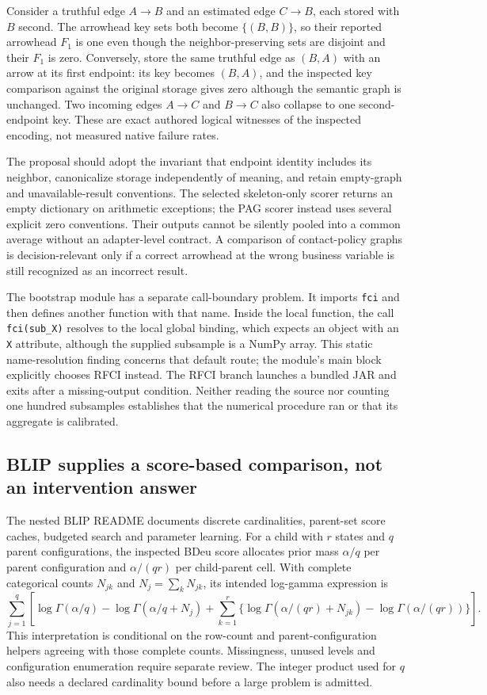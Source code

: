 Consider a truthful edge $A\to B$ and an estimated edge $C\to B$, each stored
with $B$ second. The arrowhead key sets both become $\{(B,B)\}$, so their
reported arrowhead $F_1$ is one even though the neighbor-preserving sets are
disjoint and their $F_1$ is zero. Conversely, store the same truthful edge as
$(B,A)$ with an arrow at its first endpoint: its key becomes $(B,A)$, and
the inspected key comparison against the original storage gives zero although
the semantic graph is unchanged. Two incoming edges $A\to C$ and $B\to C$
also collapse to one second-endpoint key. These are exact authored logical
witnesses of the inspected encoding, not measured native failure rates.
\citep{exec28_nested_reference}

The proposal should adopt the invariant that endpoint identity includes its
neighbor, canonicalize storage independently of meaning, and retain empty-graph
and unavailable-result conventions. The selected skeleton-only scorer returns
an empty dictionary on arithmetic exceptions; the PAG scorer instead uses
several explicit zero conventions. Their outputs cannot be silently pooled
into a common average without an adapter-level contract. A comparison of
contact-policy graphs is decision-relevant only if a correct arrowhead at the
wrong business variable is still recognized as an incorrect result.
\citep{exec28_nested_sources}

The bootstrap module has a separate call-boundary problem. It imports
\texttt{fci} and then defines another function with that name. Inside the local
function, the call \texttt{fci(sub\_X)} resolves to the local global binding,
which expects an object with an \texttt{X} attribute, although the supplied
subsample is a NumPy array. This static name-resolution finding concerns that
default route; the module's main block explicitly chooses RFCI instead. The
RFCI branch launches a bundled JAR and exits after a missing-output condition.
Neither reading the source nor counting one hundred subsamples establishes
that the numerical procedure ran or that its aggregate is calibrated.
\citep{exec28_nested_sources}

\subsection{BLIP supplies a score-based comparison, not an intervention answer}
The nested BLIP README documents discrete cardinalities, parent-set score
caches, budgeted search and parameter learning. For a child with $r$ states
and $q$ parent configurations, the inspected BDeu score allocates prior mass
$\alpha/q$ per parent configuration and $\alpha/(qr)$ per child-parent cell.
With complete categorical counts $N_{jk}$ and $N_j=\sum_kN_{jk}$, its intended
log-gamma expression is
\[
 \sum_{j=1}^{q}\left[\log\Gamma(\alpha/q)-\log\Gamma(\alpha/q+N_j)
 +\sum_{k=1}^{r}\{\log\Gamma(\alpha/(qr)+N_{jk})-\log\Gamma(\alpha/(qr))\}\right].
\]
This interpretation is conditional on the row-count and parent-configuration
helpers agreeing with those complete counts. Missingness, unused levels and
configuration enumeration require separate review. The integer product used
for $q$ also needs a declared cardinality bound before a large problem is
admitted.\citep{exec28_nested_sources}

